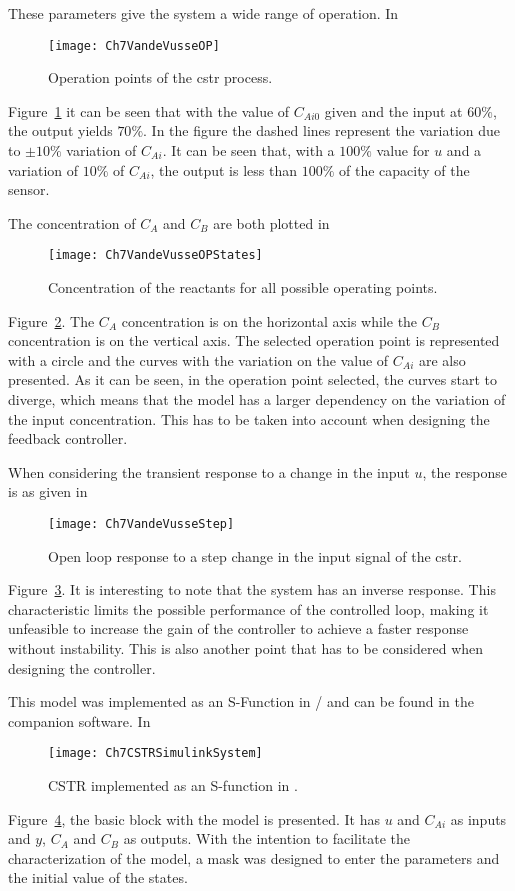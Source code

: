 These parameters give the system a wide range of operation. In %
\begin{figure}
	\centering
	\texttt{[image: Ch7VandeVusseOP]}
	\caption{Operation points of the \gls{cstr} process.}
	\label{fig:Ch7VandeVusseOP}
\end{figure}
Figure~\ref{fig:Ch7VandeVusseOP} it can be seen that with the value of $C_{Ai0}$ given and the input at $60\%$, the output yields $70\%$. In the figure the dashed lines represent the variation due to $\pm 10\%$ variation of $C_{Ai}$. It can be seen that, with a $100 \%$ value for $u$ and a variation of $10\%$ of $C_{Ai}$, the output is less than $100\%$ of the capacity of the sensor.

The concentration of $C_A$ and $C_B$ are both plotted in %
\begin{figure}
	\centering
	\texttt{[image: Ch7VandeVusseOPStates]}
	\caption{Concentration of the reactants for all possible operating points.}
	\label{fig:Ch7VandeVusseOPStates}
\end{figure}
%
Figure~\ref{fig:Ch7VandeVusseOPStates}. The $C_A$ concentration is on the horizontal axis while the $C_B$ concentration is on the vertical axis. The selected operation point is represented with a circle and the curves with the variation on the value of $C_{Ai}$ are also presented. As it can be seen, in the operation point selected, the curves start to diverge, which means that the model has a larger dependency on the variation of the input concentration. This has to be taken into account when designing the feedback controller.

When considering the transient response to a change in the input $u$, the response is as given in %
\begin{figure}
	\centering
	\texttt{[image: Ch7VandeVusseStep]}
	\caption{Open loop response to a step change in the input signal of the \gls{cstr}.}
	\label{fig:Ch7VandeVusseStep}
\end{figure}
%
Figure~\ref{fig:Ch7VandeVusseStep}. It is interesting to note that the system has an inverse response. This characteristic limits the possible performance of the controlled loop, making it unfeasible to increase the gain of the controller to achieve a faster response without instability. This is also another point that has to be considered when designing the controller.

This model was implemented as an S-Function in \matlab/\simulink{} and can be found in the companion software. In %
\begin{figure}[tb]
	\centering
	\texttt{[image: Ch7CSTRSimulinkSystem]}
	\caption{CSTR implemented as an S-function in \simulink.}
	\label{fig:Ch7CSTRSimulinkSystem}
\end{figure}
%
Figure~\ref{fig:Ch7CSTRSimulinkSystem}, the basic block with the model is presented. It has $u$ and $C_{Ai}$ as inputs and $y$, $C_A$ and $C_B$ as outputs. With the intention to facilitate the characterization of the model, a mask was designed to enter the parameters and the initial value of the states.

